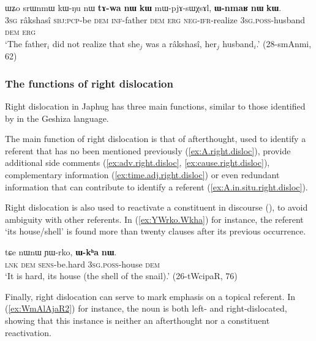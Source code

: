 \begin{exe}
\ex \label{ex:A.in.situ.right.disloc}
\gll ɯʑo srɯnmɯ kɯ-ŋu nɯ \textbf{tɤ-wa} \textbf{nɯ} \textbf{kɯ} mɯ-pjɤ-sɯχsɤl, \textbf{ɯ-nmaʁ} \textbf{nɯ} \textbf{kɯ}. \\
\textsc{3sg} râkshasî \textsc{sbj}:\textsc{pcp}-be \textsc{dem} \textsc{inf}-father \textsc{dem} \textsc{erg} \textsc{neg}-\textsc{ifr}-realize \textsc{3sg}.\textsc{poss}-husband \textsc{dem} \textsc{erg} \\
\glt `The father$_i$ did not realize that she$_j$ was a râkshasî, her$_j$ husband$_i$.' (28-smAnmi, 62)
\end{exe}

\subsubsection{The functions of right dislocation} \label{sec:right.dislocation.function}
Right dislocation in Japhug has three main functions, similar to those identified by \citet[§13.7.2]{honkasalo19geshiza} in the Geshiza language.

The main function of right dislocation is that of afterthought, used to identify a referent that has no been mentioned previously (\ref{ex:A.right.disloc}), provide additional side comments (\ref{ex:adv.right.disloc}, \ref{ex:cause.right.disloc}), complementary information (\ref{ex:time.adj.right.disloc}) or even redundant information that can contribute to identify a referent (\ref{ex:A.in.situ.right.disloc}).  

Right dislocation is also used to reactivate a constituent in discourse (\citealt[§13.7.2]{honkasalo19geshiza}), to avoid ambiguity with other referents. In (\ref{ex:YWrko.Wkha}) for instance, the referent  `its house/shell' is found more than twenty clauses after its previous occurrence.

\begin{exe}
\ex \label{ex:YWrko.Wkha}
\gll tɕe nɯnɯ ɲɯ-rko, \textbf{ɯ-kʰa} \textbf{nɯ}. \\
\textsc{lnk} \textsc{dem} \textsc{sens}-be.hard \textsc{3sg}.\textsc{poss}-house \textsc{dem} \\
\glt `It is hard, its house (the shell of the snail).' (26-tWcipaR, 76)
\end{exe}

Finally, right dislocation can serve to mark emphasis on a topical referent. In (\ref{ex:WmAlAjaR2}) for instance, the noun  is both left- and right-dislocated, showing that this instance is neither an afterthought nor a constituent reactivation.

